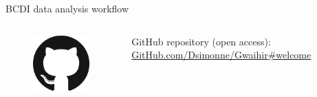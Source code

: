 \begin{frame}{BCDI data analysis workflow}
\begin{columns}
    \end{columns}

    \pause
    \begin{columns}
        \vspace{-0.02cm}
        \begin{figure}[T]
            \includegraphics[width=\textwidth]{Figures/gwaihir/GitHub-Mark-120px-plus.png}
        \end{figure}
        
        \medskip
        GitHub repository (open access\footnotemark{}): \href{GitHub.com/Dsimonne/Gwaihir\#welcome}{GitHub.com/Dsimonne/Gwaihir\#welcome} %
        
    \end{columns}
    
\end{frame}
